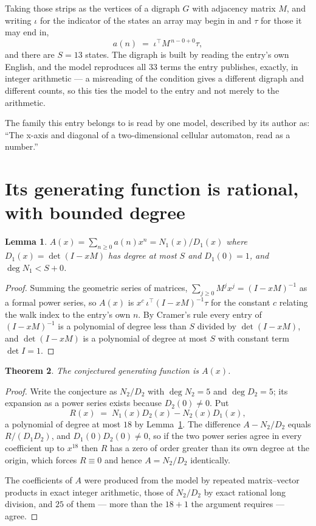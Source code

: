 \documentclass[11pt,a4paper]{article}
\theoremstyle{plain}
\newtheorem{theorem}{Theorem}
\newtheorem{lemma}[theorem]{Lemma}
\theoremstyle{definition}
\begin{document}
Taking those strips as the vertices of a digraph $G$ with adjacency matrix $M$, and writing
$\iota$ for the indicator of the states an array may begin in and $\tau$ for those it may end
in,
\[
a(n)\;=\;\iota^{\!\top}M^{\,n-0+0}\tau ,
\]
and there are $S=13$ states. The digraph is built by reading the entry's own English, and the
model reproduces all $33$ terms the entry publishes, exactly, in integer arithmetic --- a
misreading of the condition gives a different digraph and different counts, so this ties the
model to the entry and not merely to the arithmetic.

The family this entry belongs to is read by one model, described by its author as: ``The x-axis and diagonal of a two-dimensional cellular automaton, read as a number.''


\section{Its generating function is rational, with bounded degree}

\begin{lemma}\label{lem:rat}
$A(x)=\sum_{n\ge0}a(n)x^n=N_1(x)/D_1(x)$ where $D_1(x)=\det(I-xM)$ has degree at most
$S$ and $D_1(0)=1$, and $\deg N_1<S+0$.
\end{lemma}

\begin{proof}
Summing the geometric series of matrices, $\sum_{j\ge0}M^jx^j=(I-xM)^{-1}$ as a formal
power series, so $A(x)$ is $x^{c}\,\iota^{\!\top}(I-xM)^{-1}\tau$ for the constant $c$
relating the walk index to the entry's own $n$. By Cramer's rule every entry of
$(I-xM)^{-1}$ is a polynomial of degree less than $S$ divided by $\det(I-xM)$, and
$\det(I-xM)$ is a polynomial of degree at most $S$ with constant term $\det I=1$.
\end{proof}

\begin{theorem}
The conjectured generating function is $A(x)$.
\end{theorem}

\begin{proof}
Write the conjecture as $N_2/D_2$ with $\deg N_2=5$ and $\deg D_2=5$; its expansion as a
power series exists because $D_2(0)\neq0$. Put
\[
R(x)\;=\;N_1(x)D_2(x)-N_2(x)D_1(x),
\]
a polynomial of degree at most $18$ by Lemma~\ref{lem:rat}. The difference
$A-N_2/D_2$ equals $R/(D_1D_2)$, and $D_1(0)D_2(0)\neq0$, so if the two power series agree in
every coefficient up to $x^{18}$ then $R$ has a zero of order greater than its own
degree at the origin, which forces $R\equiv0$ and hence $A=N_2/D_2$ identically.

The coefficients of $A$ were produced from the model by repeated matrix--vector products in
exact integer arithmetic, those of $N_2/D_2$ by exact rational long division, and $25$
of them --- more than the $18+1$ the argument requires --- agree.
\end{proof}
\end{document}
